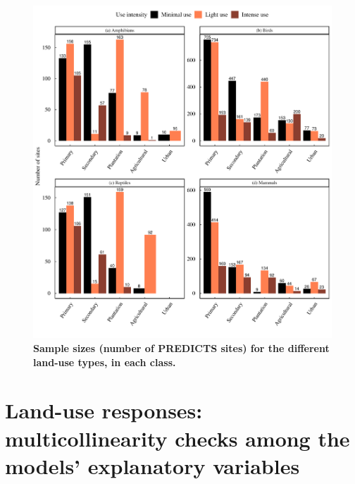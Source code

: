 \begin{figure}[h!]
\centering
\includegraphics[scale=0.7]{Supporting/Chapter4/Figures/Sample_size_figure}
\caption[Sample sizes (number of PREDICTS sites) for the different land-use types, in each class]{\textbf{Sample sizes (number of PREDICTS sites) for the different land-use types, in each class.}}
\label{SI_4_Figure4}
\end{figure}

\clearpage
\section{Land-use responses: multicollinearity checks among the models' explanatory variables}

